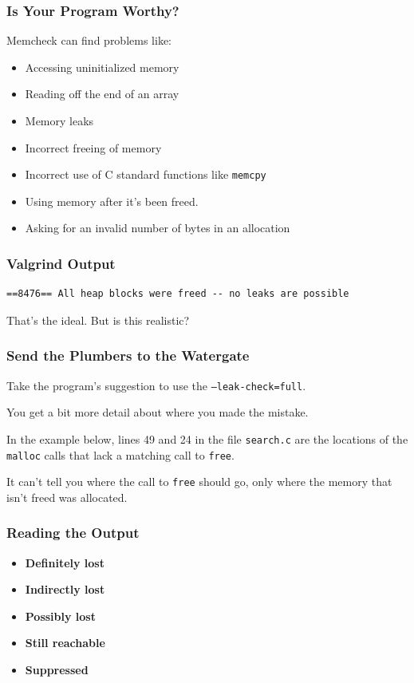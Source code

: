 \begin{frame}
	\frametitle{Is Your Program Worthy?}

	Memcheck can find problems like:
	\begin{itemize}
		\item Accessing uninitialized memory
		\item Reading off the end of an array
		\item Memory leaks
		\item Incorrect freeing of memory
		\item Incorrect use of C standard functions like \texttt{memcpy}
		\item Using memory after it's been freed.
		\item Asking for an invalid number of bytes in an allocation
	\end{itemize}

\end{frame}

\begin{frame}[fragile]
	\frametitle{Valgrind Output}
	{\scriptsize
		\begin{verbatim}
==8476== All heap blocks were freed -- no leaks are possible
\end{verbatim}
	}

That's the ideal. But is this realistic?
\end{frame}

\begin{frame}
	\frametitle{Send the Plumbers to the Watergate}


	Take the program's suggestion to use the \texttt{--leak-check=full}.

	You get a bit more detail about where you made the mistake.

	In the example below, lines 49 and 24 in the file \texttt{search.c} are the locations of the \texttt{malloc} calls that lack a matching call to \texttt{free}.

	It can't tell you where the call to \texttt{free} should go, only where the memory that isn't freed was allocated.

\end{frame}

\begin{frame}
	\frametitle{Reading the Output}

	\begin{itemize}
		\item \textbf{Definitely lost}
		\item \textbf{Indirectly lost}
		\item \textbf{Possibly lost}
		\item \textbf{Still reachable}
		\item \textbf{Suppressed}
	\end{itemize}

\end{frame}


